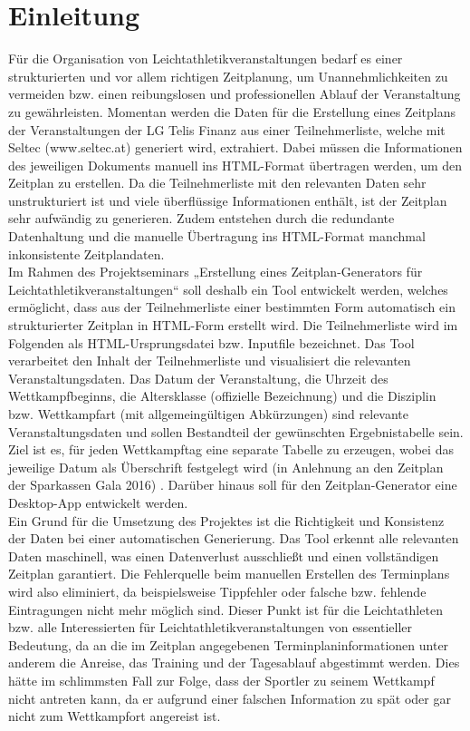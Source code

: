 
\chapter{Einleitung}
\label{chap:Einleitung}

Für die Organisation von Leichtathletikveranstaltungen bedarf es einer strukturierten und vor allem richtigen Zeitplanung, um Unannehmlichkeiten zu vermeiden bzw. einen reibungslosen und professionellen Ablauf der Veranstaltung zu gewährleisten. Momentan werden die Daten für die Erstellung eines Zeitplans der Veranstaltungen der LG Telis Finanz aus einer Teilnehmerliste, welche mit Seltec (www.seltec.at) generiert wird, extrahiert. Dabei müssen die Informationen des jeweiligen Dokuments manuell ins \ac{HTML}-Format übertragen werden, um den Zeitplan zu erstellen. Da die Teilnehmerliste mit den relevanten Daten sehr unstrukturiert ist und viele überflüssige Informationen enthält, ist der Zeitplan sehr aufwändig zu generieren. Zudem entstehen durch die redundante Datenhaltung und die manuelle Übertragung ins HTML-Format manchmal inkonsistente Zeitplandaten. \\
Im Rahmen des Projektseminars „Erstellung eines Zeitplan-Generators für Leichtathletikveranstaltungen“ soll deshalb ein Tool entwickelt werden, welches ermöglicht, dass aus der Teilnehmerliste einer bestimmten Form automatisch ein strukturierter Zeitplan in HTML-Form erstellt wird. Die Teilnehmerliste wird im Folgenden als \ac{HTML}-Ursprungsdatei bzw. Inputfile bezeichnet. Das Tool verarbeitet den Inhalt der Teilnehmerliste und visualisiert die relevanten Veranstaltungsdaten. Das Datum der Veranstaltung, die Uhrzeit des Wettkampfbeginns, die Altersklasse (offizielle Bezeichnung) und die Disziplin bzw. Wettkampfart (mit allgemeingültigen Abkürzungen) sind relevante Veranstaltungsdaten und sollen Bestandteil der gewünschten Ergebnistabelle sein. Ziel ist es, für jeden Wettkampftag eine separate Tabelle zu erzeugen, wobei das jeweilige Datum als Überschrift festgelegt wird (in Anlehnung an den Zeitplan der Sparkassen Gala 2016) \cite{gala}.
Darüber hinaus soll für den Zeitplan-Generator eine Desktop-App entwickelt werden.\\
Ein Grund für die Umsetzung des Projektes ist die Richtigkeit und Konsistenz der Daten bei einer automatischen Generierung. Das Tool erkennt alle relevanten Daten maschinell, was einen Datenverlust ausschließt und einen vollständigen Zeitplan garantiert. Die Fehlerquelle beim manuellen Erstellen des Terminplans wird also eliminiert, da beispielsweise Tippfehler oder falsche bzw. fehlende Eintragungen nicht mehr möglich sind. Dieser Punkt ist für die Leichtathleten bzw. alle Interessierten für Leichtathletikveranstaltungen von essentieller Bedeutung, da an die im Zeitplan angegebenen Terminplaninformationen unter anderem die Anreise, das Training und der Tagesablauf abgestimmt werden. Dies hätte im schlimmsten Fall zur Folge, dass der Sportler zu seinem Wettkampf nicht antreten kann, da er aufgrund einer falschen Information zu spät oder gar nicht zum Wettkampfort angereist ist.\\
